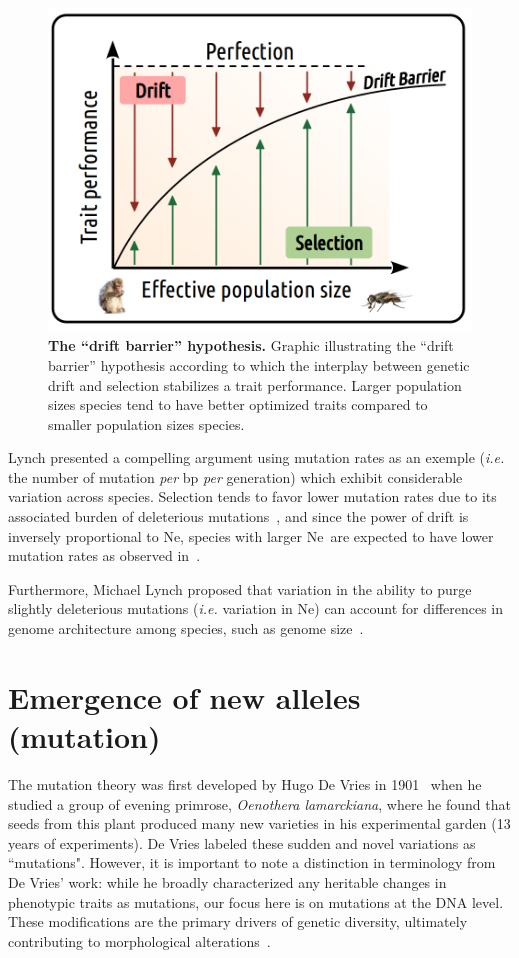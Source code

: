 \begin{figure}[H]
    \centering
    \includegraphics[width=0.6\linewidth]{figures/drift_selection.png}
    \caption[The “drift barrier” hypothesis]{\textbf{The “drift barrier” hypothesis.} Graphic illustrating the “drift barrier” hypothesis according to which the interplay between genetic drift and selection stabilizes a trait performance. Larger population sizes species tend to have better optimized traits compared to smaller population sizes species.}
    \label{fig:drift_selection}
\end{figure}

Lynch presented a compelling argument using mutation rates as an exemple (\textit{i.e.} the number of mutation \textit{per} bp \textit{per} generation) which exhibit considerable variation across species. Selection tends to favor lower mutation rates due to its associated burden of deleterious mutations~\citep{kimura_evolutionary_1967, lynch_cellular_2008}, and since the power of drift is inversely proportional to \acrshort{Ne}, species with larger \acrshort{Ne}~are expected to have lower mutation rates as observed in~\citet{sung_drift-barrier_2012}.

Furthermore, Michael Lynch proposed that variation in the ability to purge slightly deleterious mutations (\textit{i.e.} variation in \acrshort{Ne}) can account for differences in genome architecture among species, such as genome size~\citep{lynch_origins_2003, lefebure_less_2017, merel_relaxed_2024}.

\section{Emergence of new alleles (mutation)}

The mutation theory was first developed by Hugo De Vries in 1901~\citep{vries_mutationstheorie_1901, allen_hugo_1969} when he studied a group of evening primrose, \textit{Oenothera lamarckiana}, where he found that seeds from this plant produced many new varieties in his experimental garden (13 years of experiments). De Vries labeled these sudden and novel variations as “mutations". However, it is important to note a distinction in terminology from De Vries' work: while he broadly characterized any heritable changes in phenotypic traits as mutations, our focus here is on mutations at the DNA level. These modifications are the primary drivers of genetic diversity, ultimately contributing to morphological alterations~\citep{nei_roles_2011}.

